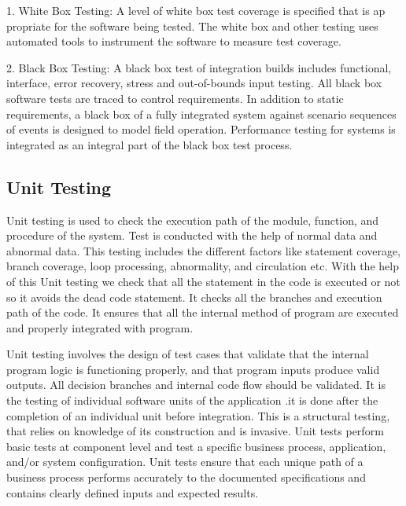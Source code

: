 \documentclass[12pt]{report}
\begin{document}
\hspace{1.7 cm} 1. White Box Testing: A level of white box test coverage is specified that is ap propriate for 
the software being tested. The white box and other testing uses automated tools to instrument 
the software to measure test coverage.

2. Black Box Testing: A black box test of integration builds includes functional, interface, 
error recovery, stress and out-of-bounds input testing. All black box software tests are traced 
to control requirements. In addition to static requirements, a black box of a fully integrated 
system against scenario sequences of events is designed to model field operation. 
Performance testing for systems is integrated as an integral part of the black box test process.


\subsection{ Unit Testing
}
\justifying
\setlength{\parindent}{4em}
\setlength{\parskip}{0.5em}
\renewcommand{\baselinestretch}{1.5}
\normalsize

Unit testing is used to check the execution path of the module, function, and procedure of 
the system. Test is conducted with the help of normal data and abnormal data. This testing 
includes the different factors like statement coverage, branch coverage, loop processing, 
abnormality, and circulation etc. With the help of this Unit testing we check that all the 
statement in the code is executed or not so it avoids the dead code statement. It checks all 
the branches and execution path of the code. It ensures that all the internal method of 
program are executed and properly integrated with program.

Unit testing involves the design of test cases that validate that the internal program logic is 
functioning properly, and that program inputs produce valid outputs. All decision branches 
and internal code flow should be validated. It is the testing of individual software units of 
the application .it is done after the completion of an individual unit before integration. This 
is a structural testing, that relies on knowledge of its construction and is invasive. Unit tests 
perform basic tests at component level and test a specific business process, application, 
and/or system configuration. Unit tests ensure that each unique path of a business process 
performs accurately to the documented specifications and contains clearly defined inputs 
and expected results.
\end{document}
